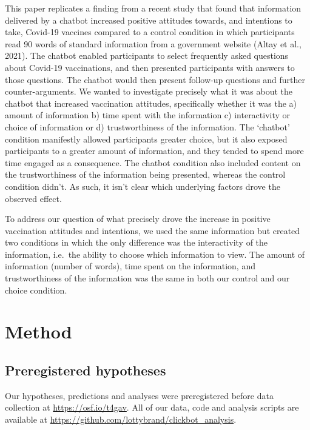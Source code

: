 \documentclass[
  english,
  ,jou,floatsintext]{apa6}
\begin{document}
This paper replicates a finding from a recent study that found that information delivered by a chatbot increased positive attitudes towards, and intentions to take, Covid-19 vaccines compared to a control condition in which participants read 90 words of standard information from a government website (Altay et al., 2021). The chatbot enabled participants to select frequently asked questions about Covid-19 vaccinations, and then presented participants with answers to those questions. The chatbot would then present follow-up questions and further counter-arguments. We wanted to investigate precisely what it was about the chatbot that increased vaccination attitudes, specifically whether it was the a) amount of information b) time spent with the information c) interactivity or choice of information or d) trustworthiness of the information. The `chatbot' condition manifestly allowed participants greater choice, but it also exposed participants to a greater amount of information, and they tended to spend more time engaged as a consequence. The chatbot condition also included content on the trustworthiness of the information being presented, whereas the control condition didn't. As such, it isn't clear which underlying factors drove the observed effect.

To address our question of what precisely drove the increase in positive vaccination attitudes and intentions, we used the same information but created two conditions in which the only difference was the interactivity of the information, i.e.~the ability to choose which information to view. The amount of information (number of words), time spent on the information, and trustworthiness of the information was the same in both our control and our choice condition.

\hypertarget{method}{%
\section{Method}\label{method}}

\hypertarget{preregistered-hypotheses}{%
\subsection{Preregistered hypotheses}\label{preregistered-hypotheses}}

Our hypotheses, predictions and analyses were preregistered before data collection at \url{https://osf.io/t4gav}. All of our data, code and analysis scripts are available at \url{https://github.com/lottybrand/clickbot_analysis}.
\end{document}
